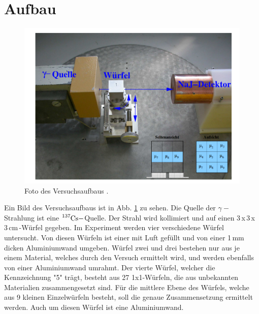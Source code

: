 \section{Aufbau}
\label{sec:aufbau}


        \begin{figure}
            \centering
            \includegraphics{aufbau.png}
            \caption{Foto des Versuchsaufbaus \cite{tomneu}.}
            \label{fig:aufbau}
        \end{figure}

        Ein Bild des Versuchsaufbaus ist in Abb. \ref{fig:aufbau} zu sehen. 
        Die Quelle der $\gamma-$Strahlung ist eine $\ce{^{137}Cs}-$Quelle.
        Der Strahl wird kollimiert und auf einen 3\,x\,3\,x\,3\,cm\,-Würfel gegeben. 
        Im Experiment werden vier verschiedene Würfel untersucht. 
        Von diesen Würfeln ist einer mit Luft gefüllt und von einer 1\,mm dicken 
        Aluminiumwand umgeben.
        Würfel zwei und drei bestehen nur aus je einem 
        Material, welches durch den Versuch ermittelt wird, und werden 
        ebenfalls von einer Aluminiumwand umrahmt. 
        Der vierte Würfel, welcher die Kennzeichnung "5" trägt, 
        besteht aus 27 1x1-Würfeln, die aus unbekannten Materialien
        zusammengesetzt sind. Für die mittlere Ebene des Würfels, 
        welche aus 9 kleinen Einzelwürfeln besteht, soll die genaue 
        Zusammensetzung ermittelt werden. Auch um diesen Würfel 
        ist eine Aluminiumwand.